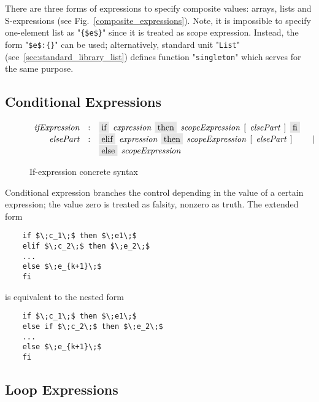 There are three forms of expressions to specify composite values: arrays, lists and S-expressions (see Fig.~\ref{composite_expressions}). Note, it is impossible
to specify one-element list as "\lstinline|{$e$}|" since it is treated as scope expression. Instead, the form "\lstinline|$e$:{}|" can be used; alternatively, standard
unit "\lstinline|List|" (see~\ref{sec:standard_library_list}) defines function "\lstinline|singleton|" which serves for the same purpose.

\subsection{Conditional Expressions}

\begin{figure}[t]
  \[
    \begin{array}{rcll}
      \defterm{ifExpression}  & : & \term{if}\s\nonterm{expression}\s\term{then}\s\nonterm{scopeExpression}\s[\s\nonterm{elsePart}\s]\s\term{fi}&\\
      \defterm{elsePart}      & : & \term{elif}\s\nonterm{expression}\s\term{then}\s\nonterm{scopeExpression}\s[\s\nonterm{elsePart}\s]&\alt\\
                              &   & \term{else}\s\nonterm{scopeExpression}&
    \end{array}
  \]
  \caption{If-expression concrete syntax}
  \label{if_expression}
\end{figure}

Conditional expression branches the control depending in the value of a certain expression; the value zero is treated as falsity, nonzero as truth. The
extended form

\begin{lstlisting}
    if $\;c_1\;$ then $\;e1\;$
    elif $\;c_2\;$ then $\;e_2\;$
    ...
    else $\;e_{k+1}\;$
    fi
\end{lstlisting}

is equivalent to the nested form

\begin{lstlisting}
    if $\;c_1\;$ then $\;e1\;$
    else if $\;c_2\;$ then $\;e_2\;$
    ...
    else $\;e_{k+1}\;$
    fi
\end{lstlisting}

\subsection{Loop Expressions}


